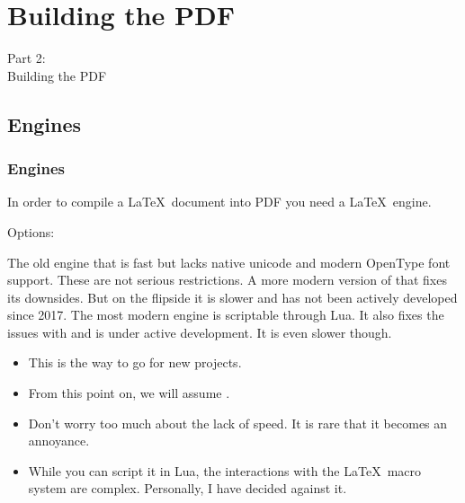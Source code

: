 {
\renewcommand{\bgcolor}{building}

\section{Building the PDF}
\begin{frame}
  \vspace{25mm}
  \begin{center}
    \Huge{Part 2:\\Building the PDF}
  \end{center}
\end{frame}

\subsection{Engines}
\begin{frame}[fragile]
  \frametitle{Engines}
  \vspace{2mm}
  In order to compile a \LaTeX\ document into PDF you need a \LaTeX\ engine.
  
  \vspace{4mm}
  Options:
  \begin{itemize}
     The old engine that is fast but lacks native unicode and modern OpenType font support. These are not serious restrictions.
     A more modern version of  that fixes its downsides. But on the flipside it is slower and has not been actively developed since 2017.
     The most modern engine is scriptable through Lua. It also fixes the issues with  and is under active development. It is even slower though.
      \begin{itemize}
        \item This is the way to go for new projects.
        \item From this point on, we will assume .
        \item Don't worry too much about the lack of speed. It is rare that it becomes an annoyance.
        \item While you can script it in Lua, the interactions with the \LaTeX\ macro system are complex. Personally, I have decided against it.
      \end{itemize}
  \end{itemize}
\end{frame}

}
